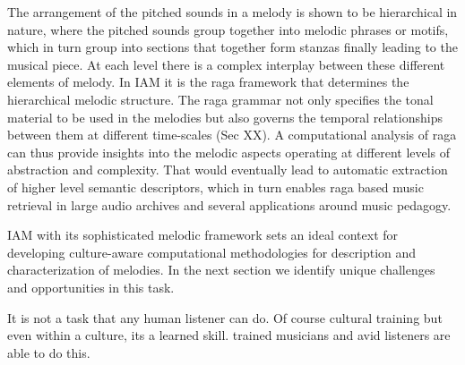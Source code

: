 The arrangement of the pitched sounds in a melody is shown to be hierarchical in nature, where the pitched sounds group together into melodic phrases or motifs, which in turn group into sections that together form stanzas finally leading to the musical piece. At each level there is a complex interplay between these different elements of melody. In IAM it is the raga framework that determines the hierarchical melodic structure. The raga grammar not only specifies the tonal material to be used in the melodies but also governs the temporal relationships between them at different time-scales (Sec XX). A computational analysis of raga can thus provide insights into the melodic aspects operating at different levels of abstraction and complexity. That would eventually lead to automatic extraction of higher level semantic descriptors, which in turn enables raga based music retrieval in large audio archives and several applications around music pedagogy.


IAM with its sophisticated melodic framework sets an ideal context for developing culture-aware computational methodologies for description and characterization of melodies. In the next section we identify unique challenges and opportunities in this task. 


It is not a task that any human listener can do. Of course cultural training but even within a culture, its a learned skill. trained musicians and avid listeners are able to do this. 


%







